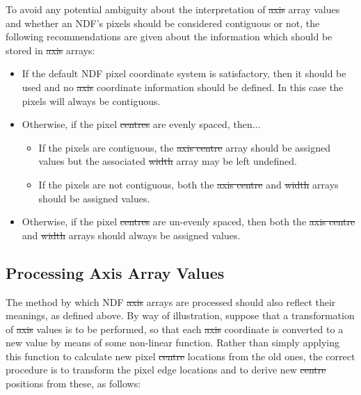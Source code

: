 To avoid any potential ambiguity about the interpretation of \st{axis\/}
array values and whether an NDF's pixels should be considered contiguous or
not, the following recommendations are given about the information which
should be stored in \st{axis\/} arrays: 

\begin{itemize}

\item If the default NDF pixel coordinate system is satisfactory, then it
should be used and no \st{axis\/} coordinate information should be defined.
In this case the pixels will always be contiguous.

\item Otherwise, if the pixel \st{centres\/} are evenly spaced, then...

\begin{itemize}

\item If the pixels are contiguous, the \st{axis centre\/} array should be
assigned values but the associated \st{width\/} array may be left
undefined. 

\item If the pixels are not contiguous, both the \st{axis centre} and
\st{width\/} arrays should be assigned values.  

\end{itemize}

\item Otherwise, if the pixel \st{centres\/} are un-evenly spaced, then
both the \st{axis centre\/} and \st{width\/} arrays should always be
assigned values. 

\end{itemize}

\subsection{Processing Axis Array Values}

The method by which NDF \st{axis\/} arrays are processed should also
reflect their meanings, as defined above. 
By way of illustration, suppose that a transformation of \st{axis\/} values
is to be performed, so that each \st{axis\/} coordinate is converted to a
new value by means of some non-linear function. 
Rather than simply applying this function to calculate new pixel
\st{centre\/} locations from the old ones, the correct procedure is to
transform 
the pixel edge locations and to derive new \st{centre\/} positions from
these, as follows: 

